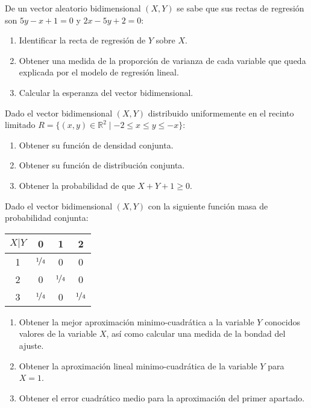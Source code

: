 \documentclass[12pt]{article}
\begin{document}
    \begin{ejercicio}
        De un vector aleatorio bidimensional $(X,Y)$ se sabe que sus rectas de regresión son $5y-x+1=0$ y $2x-5y+2=0$:
        \begin{enumerate}[label=\alph*)]
            \item Identificar la recta de regresión de $Y$ sobre $X$.
            \item Obtener una medida de la proporción de varianza de cada variable que queda explicada por el modelo de regresión lineal.
            \item Calcular la esperanza del vector bidimensional.
        \end{enumerate}
    \end{ejercicio}

    \begin{ejercicio}
        Dado el vector bidimensional $(X,Y)$ distribuido uniformemente en el recinto limitado $R = \{(x,y)\in \mathbb{R}^2 \mid -2\leq x \leq y \leq -x\}$:
        \begin{enumerate}[label=\alph*)]
            \item Obtener su función de densidad conjunta.
            \item Obtener su función de distribución conjunta.
            \item Obtener la probabilidad de que $X+Y+1\geq 0$.
        \end{enumerate}
    \end{ejercicio}

    \begin{ejercicio}
        Dado el vector bidimensional $(X,Y)$ con la siguiente función masa de probabilidad conjunta:
        \begin{table}[H]
        \centering
        \begin{tabular}{|c|ccc|}
            \hline
            $X|Y$ & 0 & 1 & 2 \\
            \hline
            1 & $\nicefrac{1}{4}$ & 0 & 0 \\
            2 & 0 & $\nicefrac{1}{4}$ & 0 \\
            3 & $\nicefrac{1}{4}$ & 0 & $\nicefrac{1}{4}$ \\
            \hline
        \end{tabular}
        \end{table}
        \begin{enumerate}[label=\alph*)]
            \item Obtener la mejor aproximación minimo-cuadrática a la variable $Y$ conocidos valores de la variable $X$, así como calcular una medida de la bondad del ajuste.
            \item Obtener la aproximación lineal minimo-cuadrática de la variable $Y$ para $X=1$.
            \item Obtener el error cuadrático medio para la aproximación del primer apartado.
        \end{enumerate}
    \end{ejercicio}
\end{document}
